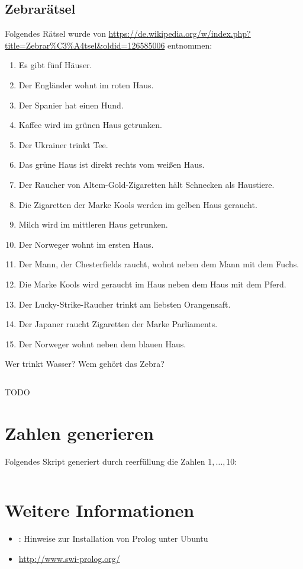 \subsection{Zebrarätsel}
Folgendes Rätsel wurde von \url{https://de.wikipedia.org/w/index.php?title=Zebrar%C3%A4tsel&oldid=126585006}
entnommen:

\begin{enumerate}
    \item Es gibt fünf Häuser.
    \item Der Engländer wohnt im roten Haus.
    \item Der Spanier hat einen Hund.
    \item Kaffee wird im grünen Haus getrunken.
    \item Der Ukrainer trinkt Tee.
    \item Das grüne Haus ist direkt rechts vom weißen Haus.
    \item Der Raucher von Altem-Gold-Zigaretten hält Schnecken als Haustiere.
    \item Die Zigaretten der Marke Kools werden im gelben Haus geraucht.
    \item Milch wird im mittleren Haus getrunken.
    \item Der Norweger wohnt im ersten Haus.
    \item Der Mann, der Chesterfields raucht, wohnt neben dem Mann mit dem Fuchs.
    \item Die Marke Kools wird geraucht im Haus neben dem Haus mit dem Pferd.
    \item Der Lucky-Strike-Raucher trinkt am liebsten Orangensaft.
    \item Der Japaner raucht Zigaretten der Marke Parliaments.
    \item Der Norweger wohnt neben dem blauen Haus.
\end{enumerate}

Wer trinkt Wasser? Wem gehört das Zebra?

\inputminted[linenos, numbersep=5pt, tabsize=4, frame=lines, label=zebraraetsel.pro]{prolog}{scripts/prolog/zebraraetsel.pro}

TODO

\section{Zahlen generieren}
Folgendes Skript generiert durch reerfüllung die Zahlen $1, \dots, 10$:

\inputminted[numbersep=5pt, tabsize=4]{prolog}{scripts/prolog/zahlen-bis-10.pl}

\section{Weitere Informationen}
\begin{itemize}
    \item \href{http://wiki.ubuntuusers.de/Prolog}{}: Hinweise zur Installation von Prolog unter Ubuntu
    \item \url{http://www.swi-prolog.org/}
\end{itemize}

